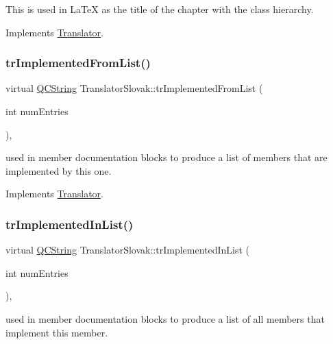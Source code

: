 This is used in La\+TeX as the title of the chapter with the class hierarchy. 

Implements \mbox{\hyperlink{class_translator}{Translator}}.

\mbox{\label{class_translator_slovak_a9d0752a3ea6aad4a91199edd4138f1bb}} 
\subsubsection{\texorpdfstring{trImplementedFromList()}{trImplementedFromList()}}
{\footnotesize\ttfamily virtual \mbox{\hyperlink{class_q_c_string}{Q\+C\+String}} Translator\+Slovak\+::tr\+Implemented\+From\+List (\begin{DoxyParamCaption}\item[{int}]{num\+Entries }\end{DoxyParamCaption})\hspace{0.3cm}{\ttfamily [inline]}, {\ttfamily [virtual]}}

used in member documentation blocks to produce a list of members that are implemented by this one. 

Implements \mbox{\hyperlink{class_translator}{Translator}}.

\mbox{\label{class_translator_slovak_a61b11ed9be30c8da14d4d9e7ea984a43}} 
\subsubsection{\texorpdfstring{trImplementedInList()}{trImplementedInList()}}
{\footnotesize\ttfamily virtual \mbox{\hyperlink{class_q_c_string}{Q\+C\+String}} Translator\+Slovak\+::tr\+Implemented\+In\+List (\begin{DoxyParamCaption}\item[{int}]{num\+Entries }\end{DoxyParamCaption})\hspace{0.3cm}{\ttfamily [inline]}, {\ttfamily [virtual]}}

used in member documentation blocks to produce a list of all members that implement this member. 

